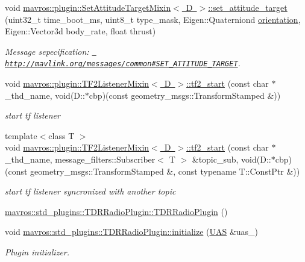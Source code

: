 \begin{DoxyCompactItemize}
void \mbox{\hyperlink{group__plugin_gac84714c4a377cd9eeef8ead08b0e8bc5}{mavros\+::plugin\+::\+Set\+Attitude\+Target\+Mixin$<$ D $>$\+::set\+\_\+attitude\+\_\+target}} (uint32\+\_\+t time\+\_\+boot\+\_\+ms, uint8\+\_\+t type\+\_\+mask, Eigen\+::\+Quaterniond \mbox{\hyperlink{structorientation}{orientation}}, Eigen\+::\+Vector3d body\+\_\+rate, float thrust)
\begin{DoxyCompactList}\small\item\em Message sepecification\+: {\ttfamily \href{http://mavlink.org/messages/common\#SET_ATTITUDE_TARGET}{\texttt{ http\+://mavlink.\+org/messages/common\#\+S\+E\+T\+\_\+\+A\+T\+T\+I\+T\+U\+D\+E\+\_\+\+T\+A\+R\+G\+ET}}}. \end{DoxyCompactList}\item 
void \mbox{\hyperlink{group__plugin_ga900fbf118417e6308394b803276bd257}{mavros\+::plugin\+::\+T\+F2\+Listener\+Mixin$<$ D $>$\+::tf2\+\_\+start}} (const char $\ast$\+\_\+thd\+\_\+name, void(D\+::$\ast$cbp)(const geometry\+\_\+msgs\+::\+Transform\+Stamped \&))
\begin{DoxyCompactList}\small\item\em start tf listener \end{DoxyCompactList}\item 
{\footnotesize template$<$class T $>$ }\\void \mbox{\hyperlink{group__plugin_gab0cf1ee9c93e92fdcabb98e9eba093c5}{mavros\+::plugin\+::\+T\+F2\+Listener\+Mixin$<$ D $>$\+::tf2\+\_\+start}} (const char $\ast$\+\_\+thd\+\_\+name, message\+\_\+filters\+::\+Subscriber$<$ T $>$ \&topic\+\_\+sub, void(D\+::$\ast$cbp)(const geometry\+\_\+msgs\+::\+Transform\+Stamped \&, const typename T\+::\+Const\+Ptr \&))
\begin{DoxyCompactList}\small\item\em start tf listener syncronized with another topic \end{DoxyCompactList}\item 
\mbox{\hyperlink{group__plugin_ga8a69ef6d9829f0c1993c6b7737606106}{mavros\+::std\+\_\+plugins\+::\+T\+D\+R\+Radio\+Plugin\+::\+T\+D\+R\+Radio\+Plugin}} ()
\item 
void \mbox{\hyperlink{group__plugin_ga396d464187dbf5852122abce024b6acd}{mavros\+::std\+\_\+plugins\+::\+T\+D\+R\+Radio\+Plugin\+::initialize}} (\mbox{\hyperlink{classmavros_1_1UAS}{U\+AS}} \&uas\+\_\+)
\begin{DoxyCompactList}\small\item\em Plugin initializer. \end{DoxyCompactList}\item 

\end{DoxyCompactItemize}
